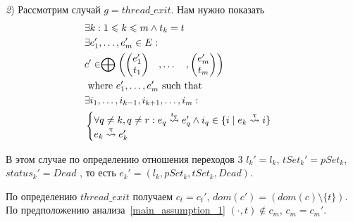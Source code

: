 {\textit 2)} Рассмотрим случай $g = thread\_exit$. Нам нужно показать 
\begin{align}
& \exists k : 1 \leqslant k \leqslant m \land t_k = t \nonumber \\
& \exists e_1', \dots, e_m' \in E: \nonumber \\
& c' \in \mathrel{\bigoplus}
\begin{pmatrix}
\begin{pmatrix}
e_1' \\
t_1 
\end{pmatrix}& ,
\dots& ,
\begin{pmatrix}
e_m' \\
t_m 
\end{pmatrix}
\end{pmatrix} \nonumber \\
& \mbox{ where } e_1', \dots, e_m' \mbox{ such that } \nonumber \\
&\exists i_1, \dots, i_{k-1}, i_{k+1}, \dots, i_m: \nonumber \\
&
\begin{cases}
\forall q \neq k, q \neq r: e_q \stackrel{i_q}{\leadsto} e_q' \land i_q \in \{i \mid e_k \stackrel{\uptau}{\leadsto} i\} \\
e_k \stackrel{\uptau}{\leadsto} e_k'
\end{cases} \nonumber 
\end{align}

В этом случае по определению отношения переходов 3 $l_k'=l_k$, $tSet_k'=pSet_k$, $status_k'=Dead$ , то есть $e_k' = (l_k, pSet_k, tSet_k, Dead)$.

По определению $thread\_exit$ получаем $c_t = c_t'$, $dom(c') = (dom(c) \setminus \{t\})$.
По предположению анализа~\ref{main_assumption_1} $(\cdot, t) \notin c_m$, $c_m = c_m'$.

